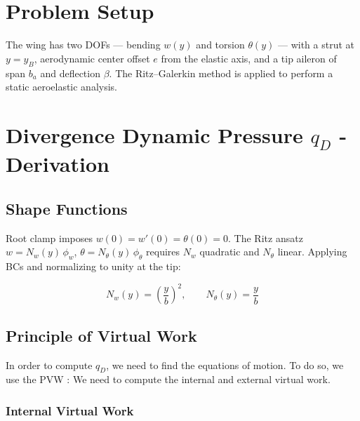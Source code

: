 
\renewcommand{\parttitle}{Divergence Dynamic Pressure $q_D$ - Derivation}
\section*{Problem Setup}

The wing has two DOFs --- bending $w(y)$ and torsion $\theta(y)$ --- with a strut at $y = y_B$,
aerodynamic center offset $e$ from the elastic axis, and a tip aileron of span $b_a$ and deflection $\beta$.
The Ritz--Galerkin method is applied to perform a static aeroelastic analysis.

\section*{\parttitle}

\subsection*{Shape Functions}

Root clamp imposes $w(0)=w'(0)=\theta(0)=0$. The Ritz ansatz
$w = N_w(y)\,\phi_w$, $\theta = N_\theta(y)\,\phi_\theta$
requires $N_w$ quadratic and $N_\theta$ linear. Applying BCs and normalizing to unity at the tip:

\begin{equation}
\boxed{N_w(y) = \left(\frac{y}{b}\right)^2, \qquad N_\theta(y) = \frac{y}{b}}
\end{equation}

\subsection*{Principle of Virtual Work}

In order to compute $q_D$, we need to find the equations of motion. To do so, we use the PVW : We need to compute the internal and external virtual work.

\subsubsection*{Internal Virtual Work}

